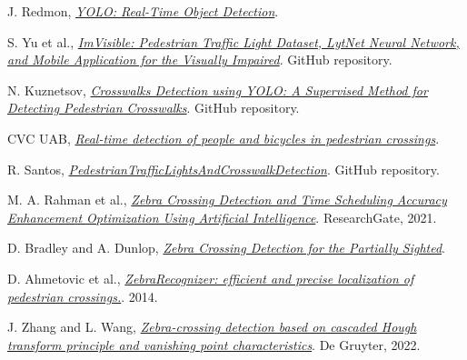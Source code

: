 \documentclass[10pt,a4paper,twocolumn,twoside]{article}
\begin{document}
\begin{thebibliography}{9}\label{sec:biblio}
	
	J. Redmon, \textit{\href{https://pjreddie.com/darknet/yolo/}{YOLO: Real-Time Object Detection}}.
	
	S. Yu et al., \textit{\href{https://github.com/samuelyu2002/ImVisible}{ImVisible: Pedestrian Traffic Light Dataset, LytNet Neural Network, and Mobile Application for the Visually Impaired}}. GitHub repository.
	
	N. Kuznetsov, \textit{\href{https://github.com/xN1ckuz/Crosswalks-Detection-using-YOLO}{Crosswalks Detection using YOLO: A Supervised Method for Detecting Pedestrian Crosswalks}}. GitHub repository.
	
	CVC UAB, \textit{\href{https://www.cvc.uab.es/portfolio/?page_id=3872}{Real-time detection of people and bicycles in pedestrian crossings}}.
	
	R. Santos, \textit{\href{https://github.com/ronaldosm/PedestrianTrafficLightsAndCrosswalkDetection}{PedestrianTrafficLightsAndCrosswalkDetection}}. GitHub repository.
	
	M. A. Rahman et al., \textit{\href{https://www.researchgate.net/publication/354299232_Zebra_Crossing_Detection_and_Time_Scheduling_Accuracy_Enhancement_Optimization_Using_Artificial_Intelligence}{Zebra Crossing Detection and Time Scheduling Accuracy Enhancement Optimization Using Artificial Intelligence}}. ResearchGate, 2021.
	
	D. Bradley and A. Dunlop, \textit{\href{https://scispace.com/pdf/zebra-crossing-detection-for-the-partially-sighted-22q9n427id.pdf}{Zebra Crossing Detection for the Partially Sighted}}.
	
	D. Ahmetovic et al., \textit{\href{https://dragan.ahmetovic.it/pdf/ahmetovic2014zebrarecognizer.pdf}{ZebraRecognizer: efficient and precise localization of pedestrian crossings.}}. 2014.
	
	J. Zhang and L. Wang, \textit{\href{https://www.degruyterbrill.com/document/doi/10.1515/comp-2022-0260/html}{Zebra-crossing detection based on cascaded Hough transform principle and vanishing point characteristics}}. De Gruyter, 2022.
	

\end{thebibliography}
\end{document}
